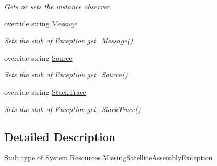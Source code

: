 \begin{DoxyCompactItemize}
\begin{DoxyCompactList}\small\item\em Gets or sets the instance observer.\end{DoxyCompactList}\item 
override string \hyperlink{class_system_1_1_resources_1_1_fakes_1_1_stub_missing_satellite_assembly_exception_a065cf7fab29a4c75d65c967aa253f57a}{Message}
\begin{DoxyCompactList}\small\item\em Sets the stub of Exception.\-get\-\_\-\-Message()\end{DoxyCompactList}\item 
override string \hyperlink{class_system_1_1_resources_1_1_fakes_1_1_stub_missing_satellite_assembly_exception_a7bea3b9f18181441c7e9a3e88226ce0c}{Source}
\begin{DoxyCompactList}\small\item\em Sets the stub of Exception.\-get\-\_\-\-Source()\end{DoxyCompactList}\item 
override string \hyperlink{class_system_1_1_resources_1_1_fakes_1_1_stub_missing_satellite_assembly_exception_aabed52c1030daa594e5df2e39bb4f52c}{Stack\-Trace}
\begin{DoxyCompactList}\small\item\em Sets the stub of Exception.\-get\-\_\-\-Stack\-Trace()\end{DoxyCompactList}\end{DoxyCompactItemize}


\subsection{Detailed Description}
Stub type of System.\-Resources.\-Missing\-Satellite\-Assembly\-Exception



